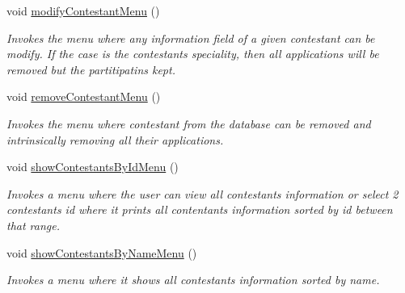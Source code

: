 \begin{DoxyCompactItemize}
\mbox{\label{class_company_m_s_a3293e5268055b1b293c0379973db3212}} 
void \hyperlink{class_company_m_s_a3293e5268055b1b293c0379973db3212}{modify\+Contestant\+Menu} ()
\begin{DoxyCompactList}\small\item\em Invokes the menu where any information field of a given contestant can be modify. If the case is the contestant\textquotesingle{}s speciality, then all applications will be removed but the partitipatins kept. \end{DoxyCompactList}\item 
\mbox{\label{class_company_m_s_ae02ea0e36a16b4dd6b1674a39e60d10c}} 
void \hyperlink{class_company_m_s_ae02ea0e36a16b4dd6b1674a39e60d10c}{remove\+Contestant\+Menu} ()
\begin{DoxyCompactList}\small\item\em Invokes the menu where contestant from the database can be removed and intrinsically removing all their applications. \end{DoxyCompactList}\item 
\mbox{\label{class_company_m_s_a0967e325f26c34b4ebdf68034c4f27f6}} 
void \hyperlink{class_company_m_s_a0967e325f26c34b4ebdf68034c4f27f6}{show\+Contestants\+By\+Id\+Menu} ()
\begin{DoxyCompactList}\small\item\em Invokes a menu where the user can view all contestants\textquotesingle{} information or select 2 contestants id where it prints all contentant\textquotesingle{}s information sorted by id between that range. \end{DoxyCompactList}\item 
\mbox{\label{class_company_m_s_a976fa7535e5daf0a2475178737431c96}} 
void \hyperlink{class_company_m_s_a976fa7535e5daf0a2475178737431c96}{show\+Contestants\+By\+Name\+Menu} ()
\begin{DoxyCompactList}\small\item\em Invokes a menu where it shows all contestants\textquotesingle{} information sorted by name. \end{DoxyCompactList}\item 
\mbox{\label{class_company_m_s_a21c3936cc26b7fbb4fdc4d00cfb5082b}} 

\end{DoxyCompactItemize}
